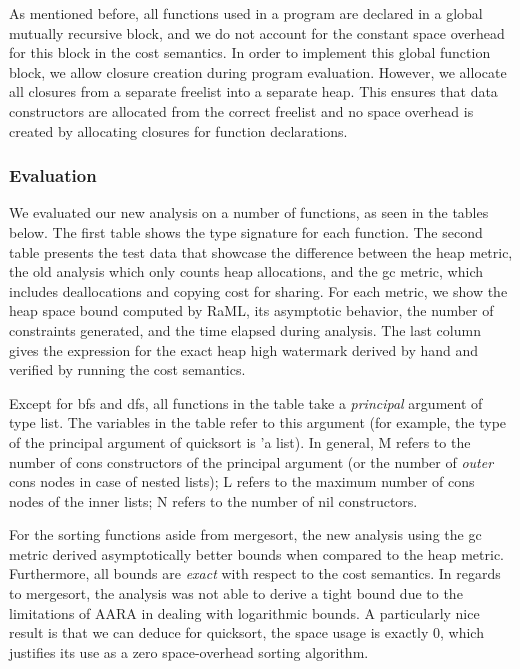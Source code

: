 \documentclass{easychair}
\theoremstyle{definition}
\begin{document}
As mentioned before, all functions used in a program are declared in a global mutually 
recursive block, and we do not account for the constant space overhead for this block in 
the cost semantics.  In order to implement this global function block, we allow closure creation
during program evaluation. However, we allocate all closures from a separate freelist into 
a separate heap.  This ensures that data constructors are allocated from the correct freelist 
and no space overhead is created by allocating closures for function declarations.

\subsubsection{Evaluation}
\label{sect:evaluation}

We evaluated our new analysis on a number of functions, as seen in the tables below. 
The first table shows the type signature for each function. The second table presents the test 
data that
showcase the difference between the heap metric, the old analysis which only counts 
heap allocations, and the gc metric, which includes deallocations and copying cost for sharing.
For each metric, we show the heap space bound computed by RaML, its asymptotic behavior, 
the number of constraints generated, and the time elapsed during analysis. The last column gives
the expression for the exact heap high watermark derived by hand and verified by running the 
cost semantics.

Except for bfs and dfs, all functions in the table take a \emph{principal} argument of type list. 
The variables in the table refer to this argument (for example, the type of the 
principal argument of 
quicksort is 'a list). In general, M refers to the number of cons constructors of the principal 
argument (or the number of \emph{outer} cons nodes in case of nested lists); L refers to the
maximum number of cons nodes of the inner lists; N refers to the number of nil constructors.

For the sorting functions aside from mergesort, the new analysis using the gc metric
derived asymptotically better bounds when compared to the heap metric. Furthermore,
all bounds are \emph{exact} with respect to the cost semantics. In regards to mergesort, 
the analysis was not able to derive a tight bound due to the limitations of AARA in dealing 
with logarithmic bounds. A particularly nice result is that we can deduce for quicksort, 
the space usage is exactly 0, which justifies its use as a zero space-overhead sorting algorithm.
\end{document}
